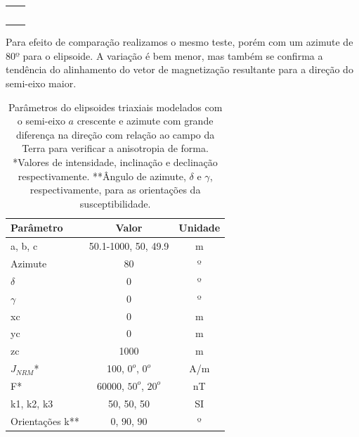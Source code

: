 \begin{table}[h!]
	\begin{center}
		\begin{tabular}{lc}
			
			& \\
			& \\
			& \\
			& \\
			& \\
			
		\end{tabular}
	\end{center}
\end{table}

Para efeito de comparação realizamos o mesmo teste, porém com um azimute de 80$º$ para o elipsoide. A variação é bem menor, mas também se confirma a tendência do alinhamento do vetor de magnetização resultante para a direção do semi-eixo maior.

\vspace{2cm}

\begin{table}[h!]
	\begin{center}
		\begin{tabular}{|l|c|c|}
			\hline
			\textbf{Parâmetro}  & \textbf{Valor}  & \textbf{Unidade} \\
			\hline 
			a, b, c & 50.1-1000, 50, 49.9 & m\\
			\hline
			Azimute   & $80$ & º\\
			\hline
			$\delta$    & $0$ & º\\
			\hline
			$\gamma$   & $0$  & º\\
			\hline
			xc   & 0  & m\\
			\hline          
			yc   & 0  & m\\
			\hline                
			zc   & 1000  & m\\
			\hline
			$J_{NRM}$*  & 100, $0^o$, $0^o$  & A/m\\
			\hline
			F*    & 60000, $50^o$, $20^o$ & nT\\
			\hline
			k1, k2, k3   & 50, 50, 50  & SI\\
			\hline
			Orientações k**   & $0$, $90$, $90$  & º\\
			\hline
		\end{tabular}
		\caption{Parâmetros do elipsoides triaxiais modelados com o semi-eixo $a$ crescente e azimute com grande diferença na direção com relação ao campo da Terra para verificar a anisotropia de forma. *Valores de intensidade, inclinação e declinação respectivamente. **Ângulo de azimute, $\delta$ e $\gamma$, respectivamente, para as orientações da susceptibilidade.}
	\end{center}
	\label{tab:ellipsoid_shape_iso80}
\end{table}

